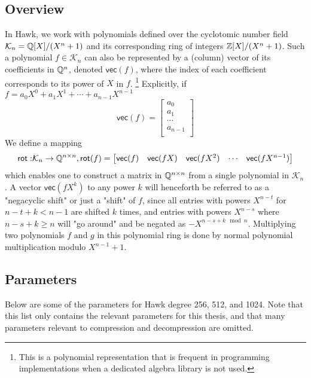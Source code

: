 \subsection{Overview}
In Hawk, we work with polynomials defined over the cyclotomic number field $\mathcal{K}_n = \mathbb{Q}[X]/(X^n +1)$ and its corresponding ring of integers
$\mathbb{Z}[X] / (X^n + 1)$. Such a polynomial $f \in \mathcal{K}_n$ can also be represented by a (column) vector of its coefficients in $\mathbb{Q}^n$, 
denoted $\mathsf{vec}(f)$, where the index of each coefficient corresponds to its power of $X$ in $f$. 
\footnote{This is a polynomial representation that is frequent in programming implementations when a dedicated algebra library is not used.}
Explicitly, if $f = a_0 X^0 + a_1 X^1 + \cdots + a_{n-1} X^{n-1}$
\[
    \mathsf{vec}(f) = 
    \begin{bmatrix}
        a_0 \\
        a_1 \\
        \cdots \\
        a_{n-1} \\
    \end{bmatrix}
\] 
We define a mapping 
\[\mathsf{rot:} \mathcal{K}_n \rightarrow \mathbb{Q}^{n \times n}, \mathsf{rot}(f) = 
\begin{bmatrix} 
    \mathsf{vec}(f) & \mathsf{vec}(fX) & \mathsf{vec}(fX^2) & \cdots & \mathsf{vec}(fX^{n-1})
\end{bmatrix}    
\]
which enables one to construct a matrix in $\mathbb{Q}^{n \times n}$ from a single polynomial in $\mathcal{K}_n$. A vector $\mathsf{vec}(fX^k)$ to any power $k$ will 
henceforth be referred to as a "negacyclic shift" or just a "shift" of $f$, since all entries with powers $X^{n-t}$ for $n-t + k  < n-1$ are shifted $k$ times, 
and entries with powers $X^{n-s}$ where $n-s + k \geq n$ will "go around" and be negated as $- X^{n-s +k \mod n}$. Multiplying two polynomials $f$ and $g$ in this
polynomial ring is done by normal polynomial multiplication modulo $X^{n-1} +1$.



\subsection{Parameters}
Below are some of the parameters for Hawk degree 256, 512, and 1024. Note that this list only contains the relevant parameters for this thesis, and that many parameters relevant to 
compression and decompression are omitted.

